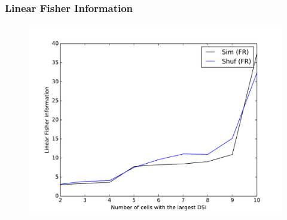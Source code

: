 \documentclass[10pt,mathserif]{beamer}
\begin{document}
\begin{frame}
\frametitle{\bf Linear Fisher Information}
\begin{figure}
\includegraphics[scale=0.42]{fisher3.pdf}
\end{figure}
   \end{frame}
\end{document}
